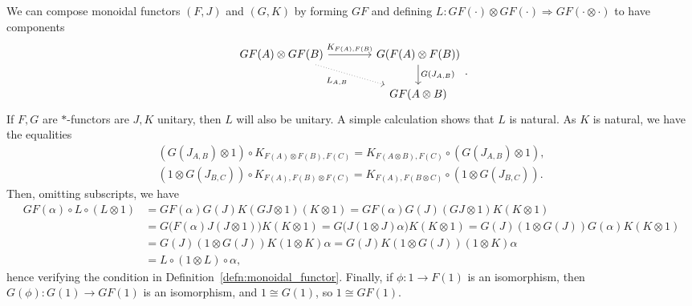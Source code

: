 \documentclass[a4paper,11pt]{article}
\theoremstyle{plain}
\theoremstyle{remark}
\newenvironment{remark}
  {\pushQED{\qed}\renewcommand{\qedsymbol}{$\triangle$}\remarkx}
  {\popQED\endremarkx}
\begin{document}
\begin{remark}\label{rem:compose_monoidal_functors}
We can compose monoidal functors $(F,J)$ and $(G,K)$ by forming $GF$ and defining $L \colon GF(\cdot)\otimes GF(\cdot) \Rightarrow GF(\cdot\otimes\cdot)$ to have components
\[ \begin{tikzcd}[column sep=9ex]
  GF(A) \otimes GF(B) \ar[r, "K_{F(A), F(B)}"] \ar[rd, "L_{A,B}"', dotted]
  & G(F(A)\otimes F(B)) \ar[d, "G(J_{A,B})"] \\
  & GF(A\otimes B)
\end{tikzcd}. \]
If $F,G$ are $*$-functors are $J,K$ unitary, then $L$ will also be unitary.  A simple calculation shows that $L$ is natural.  As $K$ is natural, we have the equalities
\begin{gather*}
  (G(J_{A,B}) \otimes 1)  \circ K_{F(A) \otimes F(B), F(C)} = K_{F(A\otimes B), F(C)}  \circ (G(J_{A,B})\otimes 1), \\
  (1 \otimes G(J_{B,C})) \circ K_{F(A), F(B)\otimes F(C)} = K_{F(A), F(B\otimes C)} \circ (1\otimes G(J_{B,C})).
\end{gather*}
Then, omitting subscripts, we have
\begin{align*}
GF(\alpha) \circ L \circ (L\otimes 1)
&=  GF(\alpha) G(J) K (GJ\otimes 1)(K\otimes 1)
=  GF(\alpha) G(J)  (GJ\otimes 1) K (K\otimes 1)  \\
&= G\big(F(\alpha) J (J\otimes 1) \big) K (K\otimes 1)
= G\big( J (1\otimes J) \alpha ) K (K\otimes 1)
= G(J) (1\otimes G(J)) G(\alpha) K (K\otimes 1) \\
&= G(J) (1\otimes G(J)) K (1\otimes K) \alpha
=  G(J) K (1\otimes G(J)) (1\otimes K) \alpha \\
&= L\circ (1\otimes L) \circ \alpha,
\end{align*}
hence verifying the condition in Definition~\ref{defn:monoidal_functor}.  Finally, if $\phi \colon 1\to F(1)$ is an isomorphism, then $G(\phi) \colon G(1) \to GF(1)$ is an isomorphism, and $1 \cong G(1)$, so $1 \cong GF(1)$.


\end{remark}
\end{document}

